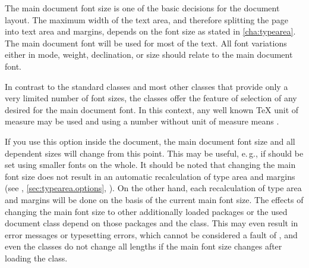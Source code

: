The main document font size is one of the basic decisions for the document
layout. The maximum width of the text area, and therefore splitting the page
into text area and margins, depends on the font size as stated in
\autoref{cha:typearea}. The main document font will be used for most 
of the text. All font variations either in mode, weight, declination, or size
should relate to the main document font.


\begin{Declaration}
\end{Declaration}
In contrast to the standard classes and most other classes that provide only
a very limited number of font sizes, the \KOMAScript{} classes offer the
feature of selection of any desired  for the main document
font. In this context, any well known \TeX{} unit of measure may be used and
using a number without unit of measure means .

If you use this option inside the document, the main document font size and
all dependent sizes will change from this point. This may be useful, e.\,g.,
if %
should be set using smaller fonts on the whole. It should be noted that
changing the main font size does not result in an automatic recalculation of
type area and margins (see
,
\autoref{sec:typearea.options},
). On the other hand, each
recalculation of type area and margins will be done on the basis of the
current main font size. The effects of changing the main font size to other
additionally loaded packages or the used document class depend on those
packages and the class. This may even result in error messages or typesetting
errors, which cannot be considered a fault of \KOMAScript, and even the
\KOMAScript{} classes do not change all lengths if the main font size changes
after loading the class.

